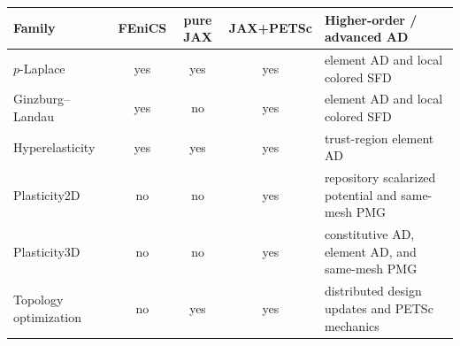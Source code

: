 \begin{tabular}{@{}l c c c >{\RaggedRight\arraybackslash}p{}@{}}
\toprule
Family & FEniCS & pure JAX & JAX+PETSc & Higher-order / advanced AD \\
\midrule
$p$-Laplace & yes & yes & yes & element AD and local colored SFD \\
Ginzburg--Landau & yes & no & yes & element AD and local colored SFD \\
Hyperelasticity & yes & yes & yes & trust-region element AD \\
Plasticity2D & no & no & yes & repository scalarized potential and same-mesh PMG \\
Plasticity3D & no & no & yes & constitutive AD, element AD, and same-mesh PMG \\
Topology optimization & no & yes & yes & distributed design updates and PETSc mechanics \\
\bottomrule
\end{tabular}
